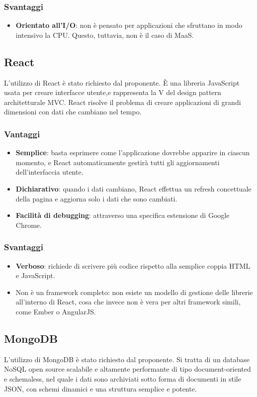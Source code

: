 \subsubsection{Svantaggi}
\begin{itemize}
\item \textbf{Orientato all'I/O}: non \`e pensato per applicazioni che sfruttano in modo intensivo la CPU. Questo, tuttavia, non \`e il caso di MaaS.
\end{itemize}
\subsection{React}
L'utilizzo di React \`e stato richiesto dal proponente. \`E una libreria JavaScript usata per creare interfacce utente,e rappresenta la V del design pattern architetturale MVC. React risolve il problema di creare applicazioni di grandi dimensioni con dati che cambiano nel tempo.
\subsubsection{Vantaggi}
\begin{itemize}
\item \textbf{Semplice}: basta esprimere come l'applicazione dovrebbe apparire in ciascun momento, e React automaticamente gestir\`a tutti gli aggiornamenti dell'interfaccia utente.
\item \textbf{Dichiarativo}: quando i dati cambiano, React effettua un refresh concettuale della pagina e aggiorna solo i dati che sono cambiati.
\item \textbf{Facilit\`a di debugging}: attraverso una specifica estensione di Google Chrome.
\end{itemize}
\subsubsection{Svantaggi}
\begin{itemize}
\item \textbf{Verboso}: richiede di scrivere pi\`u codice rispetto alla semplice coppia HTML e JavaScript.
\item{Non \`e un framework completo}: non esiste un modello di gestione delle librerie all'interno di React, cosa che invece non \`e vera per altri framework simili, come Ember o AngularJS.
\end{itemize}
\subsection{MongoDB}
L'utilizzo di MongoDB \`e stato richiesto dal proponente. Si tratta di un database NoSQL open source scalabile e altamente performante di tipo document-oriented e schemaless, nel quale i dati sono archiviati sotto forma di documenti in stile JSON, con schemi dinamici e una struttura semplice e potente.
